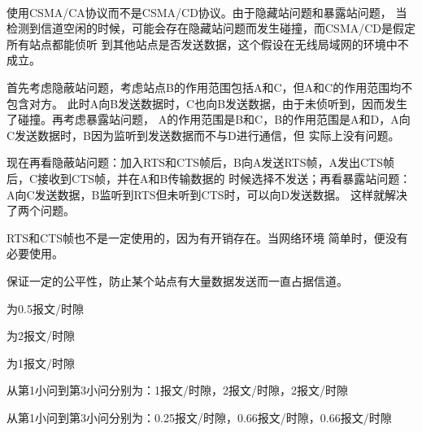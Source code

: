 \documentclass{ctexart}
\newcounter{answercnt}
\newcommand{\sCourse}{计算机网络}   %
\newcommand{\nTime}{7}             %
\newcommand{\sName}{黄昊}           %
\newcommand{\sNumber}{20204205}     %
\begin{document}
    \setcounter{answercnt}{0}
    \begin{center}
        \\
        \fontsize{13pt}{0}{\textit{\kaishu\sName\qquad\sNumber}}
    \end{center}

\answer[9-07]
使用CSMA/CA协议而不是CSMA/CD协议。由于隐藏站问题和暴露站问题，
当检测到信道空闲的时候，可能会存在隐藏站问题而发生碰撞，而CSMA/CD是假定所有站点都能侦听
到其他站点是否发送数据，这个假设在无线局域网的环境中不成立。




\answer[9-09]
首先考虑隐蔽站问题，考虑站点B的作用范围包括A和C，但A和C的作用范围均不包含对方。
此时A向B发送数据时，C也向B发送数据，由于未侦听到，因而发生了碰撞。再考虑暴露站问题，
A的作用范围是B和C，B的作用范围是A和D，A向C发送数据时，B因为监听到发送数据而不与D进行通信，但
实际上没有问题。

现在再看隐蔽站问题：加入RTS和CTS帧后，B向A发送RTS帧，A发出CTS帧后，C接收到CTS帧，并在A和B传输数据的
时候选择不发送；再看暴露站问题：A向C发送数据，B监听到RTS但未听到CTS时，可以向D发送数据。
这样就解决了两个问题。

RTS和CTS帧也不是一定使用的，因为有开销存在。当网络环境
简单时，便没有必要使用。




\answer[9-14]
保证一定的公平性，防止某个站点有大量数据发送而一直占据信道。




\answer[9-27]
\subanswer[(1)]
为0.5报文/时隙


\subanswer[(2)]
为2报文/时隙


\subanswer[(3)]
为1报文/时隙


\subanswer[(4)]
从第1小问到第3小问分别为：1报文/时隙，2报文/时隙，2报文/时隙


\subanswer[(5)]
从第1小问到第3小问分别为：0.25报文/时隙，0.66报文/时隙，0.66报文/时隙
\end{document}
